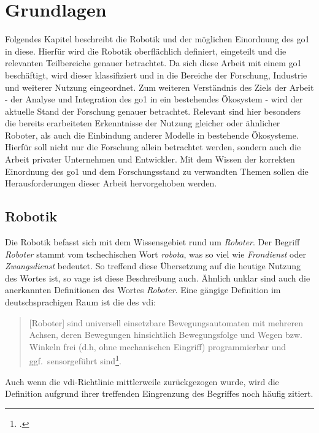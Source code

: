 \section{Grundlagen}
\label{sec:grundlagen}

Folgendes Kapitel beschreibt die Robotik und der möglichen Einordnung des \gls{go1} in diese.
Hierfür wird die Robotik oberflächlich definiert, eingeteilt und die relevanten Teilbereiche genauer betrachtet.
Da sich diese Arbeit mit einem \gls{go1} beschäftigt, wird dieser klassifiziert und in die Bereiche der Forschung, Industrie und weiterer Nutzung eingeordnet.
Zum weiteren Verständnis des Ziels der Arbeit - der Analyse und Integration des \gls{go1} in ein bestehendes Ökosystem -
wird der aktuelle Stand der Forschung genauer betrachtet.
Relevant sind hier besonders die bereits erarbeiteten Erkenntnisse der Nutzung gleicher oder ähnlicher Roboter, als auch
die Einbindung anderer Modelle in bestehende Ökosysteme.
Hierfür soll nicht nur die Forschung allein betrachtet werden, sondern auch die Arbeit privater Unternehmen und Entwickler.
Mit dem Wissen der korrekten Einordnung des \gls{go1} und dem Forschungsstand zu verwandten Themen sollen die Herausforderungen dieser
Arbeit hervorgehoben werden.

\subsection{Robotik}
\label{subsec:robotik}

Die Robotik befasst sich mit dem Wissensgebiet rund um \emph{Roboter}.
Der Begriff \emph{Roboter} stammt vom tschechischen Wort \emph{robota}, was so viel wie \emph{Frondienst} oder \emph{Zwangsdienst} bedeutet.
So treffend diese Übersetzung auf die heutige Nutzung des Wortes ist, so vage ist diese Beschreibung auch.
Ähnlich unklar sind auch die anerkannten Definitionen des Wortes \emph{Roboter}.
Eine gängige Definition im deutschsprachigen Raum ist die des \gls{vdi}:

\begin{quote}
[Roboter]
    sind universell einsetzbare Bewegungsautomaten mit mehreren Achsen,
    deren Bewegungen hinsichtlich Bewegungsfolge und Wegen bzw.
    Winkeln frei (d.h, ohne mechanischen Eingriff) programmierbar und ggf.~sensorgeführt sind\footcite{vdi_2860}.
\end{quote}

\noindent Auch wenn die \gls{vdi}-Richtlinie mittlerweile zurückgezogen wurde, wird die Definition aufgrund ihrer treffenden Eingrenzung
des Begriffes noch häufig zitiert.

